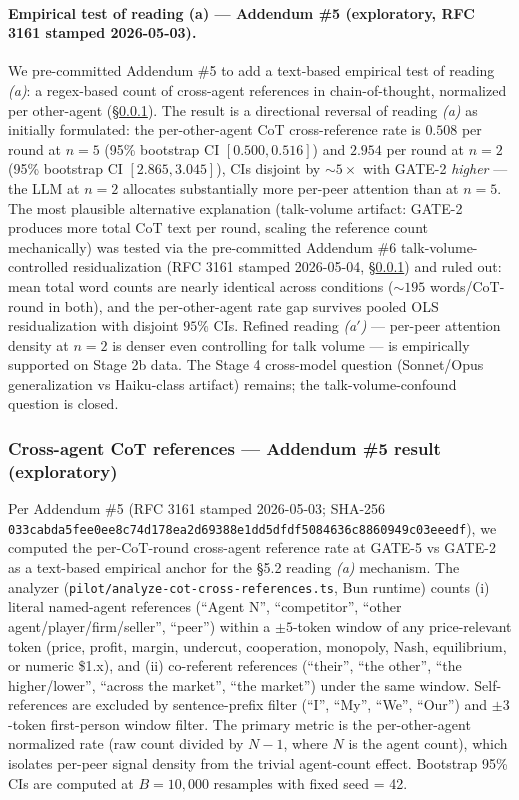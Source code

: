 \paragraph{Empirical test of reading (a) — Addendum \#5 (exploratory, RFC 3161 stamped 2026-05-03).}
We pre-committed Addendum \#5 to add a text-based empirical test of reading \emph{(a)}: a regex-based count of cross-agent references in chain-of-thought, normalized per other-agent (\S\ref{sec:discussion-asymmetry-cot}). The result is a directional reversal of reading \emph{(a)} as initially formulated: the per-other-agent CoT cross-reference rate is $0.508$ per round at $n = 5$ (95\% bootstrap CI $[0.500, 0.516]$) and $2.954$ per round at $n = 2$ (95\% bootstrap CI $[2.865, 3.045]$), CIs disjoint by $\sim 5\times$ with GATE-2 \emph{higher} --- the LLM at $n = 2$ allocates substantially more per-peer attention than at $n = 5$. The most plausible alternative explanation (talk-volume artifact: GATE-2 produces more total CoT text per round, scaling the reference count mechanically) was tested via the pre-committed Addendum \#6 talk-volume-controlled residualization (RFC 3161 stamped 2026-05-04, \S\ref{sec:discussion-asymmetry-cot}) and ruled out: mean total word counts are nearly identical across conditions ($\sim 195$ words/CoT-round in both), and the per-other-agent rate gap survives pooled OLS residualization with disjoint $95\%$ CIs. Refined reading \emph{(a$'$)} --- per-peer attention density at $n = 2$ is denser even controlling for talk volume --- is empirically supported on Stage 2b data. The Stage 4 cross-model question (Sonnet/Opus generalization vs Haiku-class artifact) remains; the talk-volume-confound question is closed.

\subsubsection{Cross-agent CoT references — Addendum \#5 result (exploratory)}
\label{sec:discussion-asymmetry-cot}

Per Addendum \#5 (RFC 3161 stamped 2026-05-03; SHA-256 \texttt{033cabda5fee0ee8c74d178ea2d69388e1dd5dfdf5084636c8860949c03eeedf}), we computed the per-CoT-round cross-agent reference rate at GATE-5 vs GATE-2 as a text-based empirical anchor for the §5.2 reading \emph{(a)} mechanism. The analyzer (\texttt{pilot/analyze-cot-cross-references.ts}, Bun runtime) counts (i) literal named-agent references (``Agent N'', ``competitor'', ``other agent/player/firm/seller'', ``peer'') within a $\pm 5$-token window of any price-relevant token (price, profit, margin, undercut, cooperation, monopoly, Nash, equilibrium, or numeric \$1.x), and (ii) co-referent references (``their'', ``the other'', ``the higher/lower'', ``across the market'', ``the market'') under the same window. Self-references are excluded by sentence-prefix filter (``I'', ``My'', ``We'', ``Our'') and $\pm 3$-token first-person window filter. The primary metric is the per-other-agent normalized rate (raw count divided by $N - 1$, where $N$ is the agent count), which isolates per-peer signal density from the trivial agent-count effect. Bootstrap 95\% CIs are computed at $B = 10{,}000$ resamples with fixed seed = 42.

